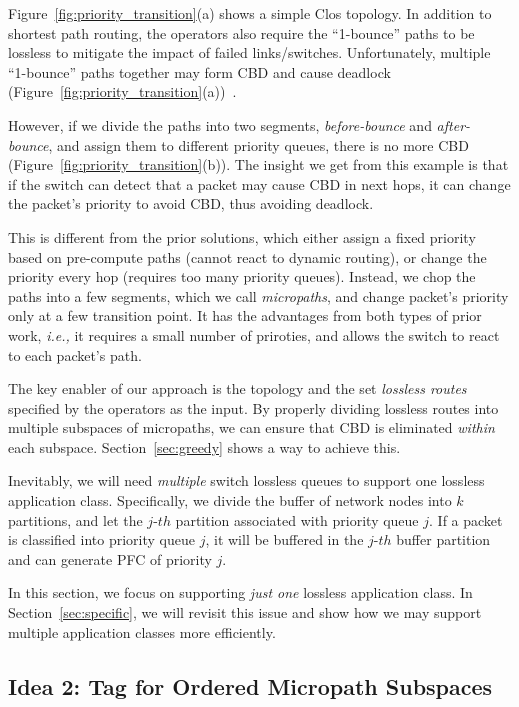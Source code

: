 Figure~\ref{fig:priority_transition}(a) shows a simple Clos topology. In addition to shortest path routing, the operators also
require the ``1-bounce'' paths to be lossless to mitigate the impact of failed links/switches. 
Unfortunately, multiple ``1-bounce'' paths together may form CBD and cause deadlock (Figure~\ref{fig:priority_transition}(a))~\cite{mellanox}.

However, if we divide the paths into two segments, {\em before-bounce} and {\em after-bounce}, and assign them to
different priority queues, there is no more CBD (Figure~\ref{fig:priority_transition}(b)). 
The insight we get from this example is that if the switch can detect that a packet may cause CBD in next hops,
it can change the packet's priority to avoid CBD, thus avoiding deadlock. 

This is different from the prior solutions, which either assign a fixed priority based on pre-compute paths (cannot 
react to dynamic routing), or change the priority every hop (requires too many priority queues). Instead, we chop 
the paths into a few segments, which we call {\em micropaths},
and change packet's priority only at a few transition point. It has the advantages from both types of prior work,
{\em i.e.,} it requires a small number of priroties, and allows the switch to react to each packet's path.

The key enabler of our approach is the topology and the set {\em lossless routes} specified by the operators
as the input. By properly dividing lossless routes into multiple subspaces of micropaths, we can
ensure that CBD is eliminated {\em within} each subspace. Section~\ref{sec:greedy} shows a way to achieve this.

Inevitably, we will need {\em multiple} switch lossless queues to support one lossless application class.
Specifically, we divide the buffer of network nodes into $k$ partitions, and let the $j$-$th$ partition associated 
with priority queue $j$. If a packet is classified into priority queue $j$, it will be buffered in the $j$-$th$ buffer 
partition and can generate PFC of priority $j$. 

In this section, we focus on supporting {\em just one} lossless application class. In Section~\ref{sec:specific}, we will revisit 
this issue and show how we may support multiple application classes more efficiently.

\subsection{Idea 2: Tag for Ordered Micropath Subspaces}\label{sec:tag_order}

